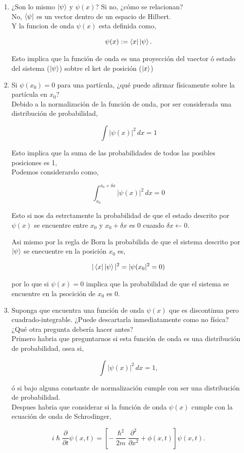 \documentclass[12pt,a4paper]{article}
\begin{document}
\begin{enumerate}[label=\alph*)]
\item ¿Son lo mismo $ \ket{\psi} $ y $ \psi(x) $? Si no, ¿cómo se relacionan?\\

No, $ \bra{\psi} $ es un vector dentro de un espacio de Hilbert.\\
Y la funcion de onda $ \psi(x) $ esta definida como,

\[
\psi(x) := \bra{x}\ket{\psi}.
\]

Esto implica que la función de onda es una proyección del vaector ó estado del sistema ($ \ket{\psi} $) sobtre el ket de posición ($ \ket{x} $)

\item Si $ \psi(x_{0}) = 0 $ para una partícula, ¿qué puede afirmar físicamente sobre la partícula en $ x_{0} $?\\

Debido a la normalización de la función de onda, por ser considerada una distribución de probabilidad,


\[
\int |\psi(x)|^{2} \, dx = 1
\]

Esto implica que la suma de las probabilidades de todos las posibles posiciones es 1,\\
Podemos considerarslo como,

\[
\int_{x_{0}}^{x_{0}+\delta x} |\psi(x)|^{2} \, dx = 0
\]

Esto si nos da estrctamente la probabilidad de que el estado descrito por $ \psi(x) $ se encuentre entre $ x_{0} $ y $ x_{0} + \delta x$ es 0 cuando $ \delta x  \leftarrow 0$.

Asi mismo por la regla de Born la probabilida de que el sistema descrito por $ \ket{\psi} $ se enecuentre en la posición $ x_0 $ es,


\[
|\bra{x}\ket{\psi}|^{2} = |\psi(x_{0}|^{2} = 0)
\]

por lo que si $ \psi(x) = 0 $ implica que la probabilidad de que el sistema se encuentre en la psocición de $ x_{0} $ es 0.


\item Suponga que encuentra una función de onda $ \psi(x) $ que es discontinua pero cuadrado-integrable. ¿Puede descartarla inmediatamente como no física? ¿Qué otra pregunta debería hacer antes?\\

Primero habria que preguntarnos si esta función de onda es una distribución de probabilidad, osea si,

\[
\int |\psi(x)|^{2}  \, dx = 1,
\]

ó si bajo alguna constante de normalización cumple con ser una distribución de probabilidad.\\

Despues habria que considerar si la función de onda $ \psi(x) $ cumple con la ecuación de onda de Schrodinger,


\[
i\hslash \frac{\partial }{\partial t} \psi(x, t) = \left[ - \frac{\hslash^{2}}{2m} \frac{\partial^{2} }{\partial x^{2}} + \phi(x, t) \right] \psi(x, t).
\]

\end{enumerate}
\end{document}
